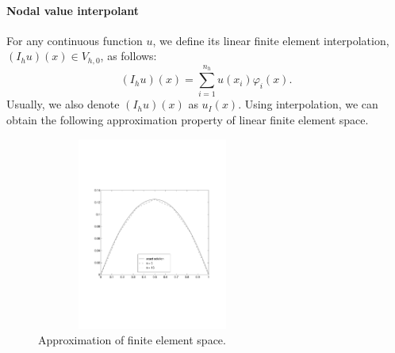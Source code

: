\paragraph{Nodal value interpolant}

For any continuous function $u$, we define its linear finite element
interpolation, $(I_h u)(x)\in V_{h,0}$,  as follows:
\begin{equation}
  \label{u-interp}
(I_h u)(x)= \sum_{i=1}^{n_h}u(x_i)\varphi_i(x).
\end{equation}
Usually, we also denote $(I_h u)(x)$ as $u_I(x)$. Using interpolation, we can obtain the following approximation property of 
linear finite element space. 
\begin{figure}[hpt]
\begin{center}
\includegraphics*[height=2.5in, width=3in]{figures/fdsolutions.pdf}
\caption{Approximation of finite element space.} 
\label{Interpolation}
\end{center}
\end{figure}


